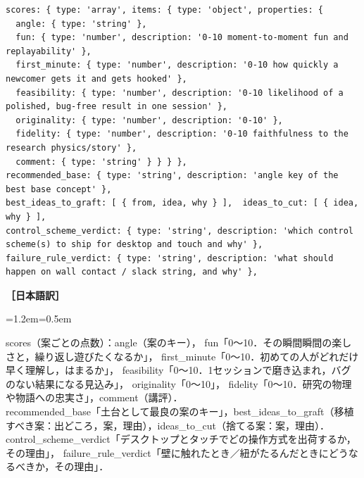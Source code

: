 \documentclass[a4paper,10pt]{ltjsarticle}
\newenvironment{yaku}{\par\vspace{-2pt}\small\noindent\textbf{［日本語訳］}\par\nopagebreak\begin{list}{}{\leftmargin=1.2em\rightmargin=0.5em\topsep=1pt}\item\relax}{\end{list}\vspace{4pt}}
\begin{document}
\begin{lstlisting}[caption={審査役の出力スキーマ（採点部分）},label={lst:judgeschema}]
scores: { type: 'array', items: { type: 'object', properties: {
  angle: { type: 'string' },
  fun: { type: 'number', description: '0-10 moment-to-moment fun and replayability' },
  first_minute: { type: 'number', description: '0-10 how quickly a newcomer gets it and gets hooked' },
  feasibility: { type: 'number', description: '0-10 likelihood of a polished, bug-free result in one session' },
  originality: { type: 'number', description: '0-10' },
  fidelity: { type: 'number', description: '0-10 faithfulness to the research physics/story' },
  comment: { type: 'string' } } } },
recommended_base: { type: 'string', description: 'angle key of the best base concept' },
best_ideas_to_graft: [ { from, idea, why } ],  ideas_to_cut: [ { idea, why } ],
control_scheme_verdict: { type: 'string', description: 'which control scheme(s) to ship for desktop and touch and why' },
failure_rule_verdict: { type: 'string', description: 'what should happen on wall contact / slack string, and why' },
\end{lstlisting}
\begin{yaku}
scores（案ごとの点数）：angle（案のキー），
fun「0〜10．その瞬間瞬間の楽しさと，繰り返し遊びたくなるか」，
first\_minute「0〜10．初めての人がどれだけ早く理解し，はまるか」，
feasibility「0〜10．1セッションで磨き込まれ，バグのない結果になる見込み」，
originality「0〜10」，
fidelity「0〜10．研究の物理や物語への忠実さ」，comment（講評）．\\
recommended\_base「土台として最良の案のキー」，best\_ideas\_to\_graft（移植すべき案：出どころ，案，理由），ideas\_to\_cut（捨てる案：案，理由）．\\
control\_scheme\_verdict「デスクトップとタッチでどの操作方式を出荷するか，その理由」，
failure\_rule\_verdict「壁に触れたとき／紐がたるんだときにどうなるべきか，その理由」．
\end{yaku}
\end{document}
